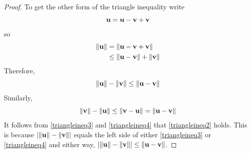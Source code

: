 \begin{proof}
To get the other form of the triangle inequality write 
\begin{equation*}
\mathbf{u}=\mathbf{u}-\mathbf{v}+\mathbf{v}
\end{equation*}
so
\begin{align*}
\| \mathbf{u}\| & =\| \mathbf{u}-\mathbf{v}+\mathbf{v}\| \\
& \leq \| \mathbf{u}-\mathbf{v}\| +\| \mathbf{v}\| 
\end{align*}
Therefore,
\begin{equation}
\| \mathbf{u}\| -\| \mathbf{v}\| \leq \| \mathbf{u}-\mathbf{v}
\|  \label{triangleineq3}
\end{equation}
Similarly,
\begin{equation}
\| \mathbf{v}\| -\| \mathbf{u}\| \leq \| \mathbf{v}-\mathbf{u}
\| =\| \mathbf{u}-\mathbf{v}\|  \label{triangleineq4}
\end{equation}
It follows from \ref{triangleineq3} and \ref{triangleineq4} that \ref{triangleineq2} holds. This
is because $\left| \| \mathbf{u}\| -\| \mathbf{v}\|
\right| $ equals the left side of either \ref{triangleineq3} or \ref{triangleineq4} and
either way, $\left| \| \mathbf{u}\| -\| \mathbf{v}\|
\right| \leq \| \mathbf{u}-\mathbf{v}\| $. 
\end{proof}
\fi